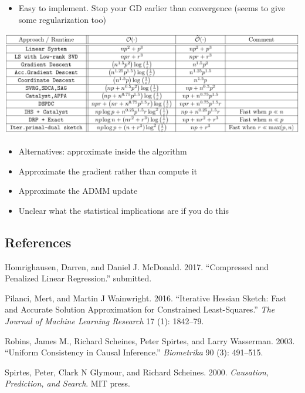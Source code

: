 \documentclass[]{article}
\providecommand{\tightlist}{%
  \setlength{\itemsep}{0pt}\setlength{\parskip}{0pt}}
\begin{document}
\begin{itemize}
\tightlist
\item
  Easy to implement. Stop your GD earlier than convergence (seems to
  give some regularization too)
\end{itemize}

\begin{center}\includegraphics{gfx/timings} \end{center}

\begin{itemize}
\item
  Alternatives: approximate inside the algorithm
\item
  Approximate the gradient rather than compute it
\item
  Approximate the ADMM update
\item
  Unclear what the statistical implications are if you do this
\end{itemize}

\hypertarget{references}{%
\subsection*{References}\label{references}}

\hypertarget{refs}{}
\leavevmode\hypertarget{ref-HomrighausenMcDonald2017}{}%
Homrighausen, Darren, and Daniel J. McDonald. 2017. ``Compressed and
Penalized Linear Regression.'' submitted.

\leavevmode\hypertarget{ref-PilanciWainwright2016}{}%
Pilanci, Mert, and Martin J Wainwright. 2016. ``Iterative Hessian
Sketch: Fast and Accurate Solution Approximation for Constrained
Least-Squares.'' \emph{The Journal of Machine Learning Research} 17 (1):
1842--79.

\leavevmode\hypertarget{ref-RobinsScheines2003}{}%
Robins, James M., Richard Scheines, Peter Spirtes, and Larry Wasserman.
2003. ``Uniform Consistency in Causal Inference.'' \emph{Biometrika} 90
(3): 491--515.

\leavevmode\hypertarget{ref-SpirtesGlymour2000}{}%
Spirtes, Peter, Clark N Glymour, and Richard Scheines. 2000.
\emph{Causation, Prediction, and Search}. MIT press.
\end{document}
